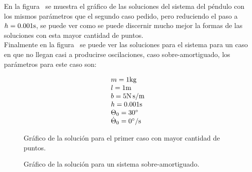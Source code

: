 
En la figura~ se muestra el gráfico de las soluciones del sistema del péndulo con los mismos parámetros que el segundo caso pedido, pero reduciendo el paso a $h = 0.001 \si[per-mode=symbol]{\second}$, se puede ver como se puede discernir mucho mejor la formas de las soluciones con esta mayor cantidad de puntos.\\
Finalmente en la figura~ se puede ver las soluciones para el sistema para un caso en que no llegan casi a producirse oscilaciones, caso sobre-amortiguado, los parámetros para este caso son: 

\begin{equation*}
                \begin{array}{ll}
                  m = 1 \si[per-mode=symbol]{\kilo\gram} \\
                  l = 1 \si[per-mode=symbol]{\meter} \\  
                  b = 5 \si[per-mode=symbol]{\newton\second\per\meter} \\ 
                  h = 0.001 \si[per-mode=symbol]{\second} \\   
                  \Theta_{0} = 30 \si[per-mode=symbol]{\degree} \\  
                  \dot{\Theta}_{0} = 0 \si[per-mode=symbol]{\degree\per\second} \\            
                \end{array}
\end{equation*}




\clearpage


\begin{figure}[H] %
\begin{center}
\caption{\label{fig:fig_res_3}\footnotesize{Gráfico de la solución para el primer caso con mayor cantidad de puntos.}}
\end{center}
\end{figure}

\clearpage


\begin{figure}[H] %
\begin{center}
\caption{\label{fig:fig_res_4}\footnotesize{Gráfico de la solución para un sistema sobre-amortiguado.}}
\end{center}
\end{figure}
